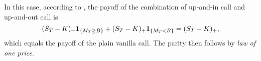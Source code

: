 \begin{enumerate}
\begin{pf}
In this case, according to , the
payoff of the combination of up-and-in call and up-and-out call is
\[
(S_T-K)_{+}\mathbf{1}_{\left\{M_T\ge B\right\}}+(S_T-K)_{+}\mathbf{1}_{\left\{M_T< B\right\}}
=(S_T-K)_{+},
\]
which equals the payoff of the plain vanilla call. The parity then follows by
\emph{law of one price}.
\end{pf}
\end{enumerate}
